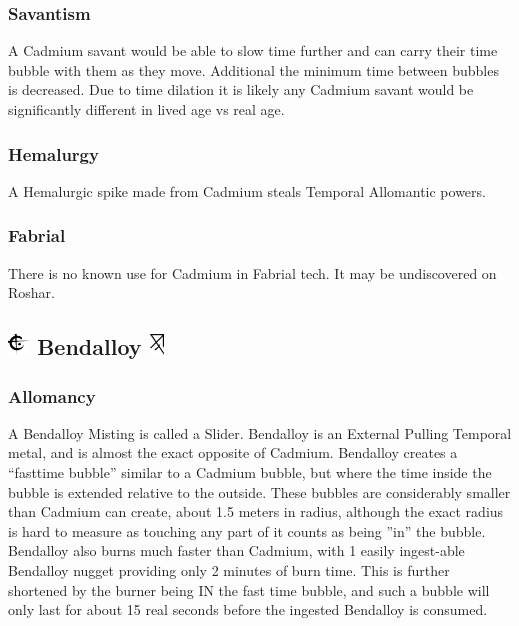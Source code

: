 \documentclass[conference]{IEEEtran}
\begin{document}
\subsubsection*{\textbf{Savantism}}
A Cadmium savant would be able to slow time further and can carry their time bubble with them as they move.\cite{Bubble-move}\cite{bubble-savant} Additional the minimum time between bubbles is decreased.\cite{TLM-CH8}  Due to time dilation it is likely any Cadmium savant would be significantly different in lived age vs real age.\\
\subsubsection*{\textbf{Hemalurgy}}
A Hemalurgic spike made from Cadmium steals Temporal Allomantic powers.\cite{HE-TB}\\
\subsubsection*{\textbf{Fabrial}}
There is no known use for Cadmium in Fabrial tech.  It may be undiscovered on Roshar.\\

\subsection*{\includegraphics[height=1em]{images/Bendalloy.png}  \textbf{Bendalloy} \includegraphics[height=1em]{images/Bendalloy_(Feruchemy).png}}
\subsubsection*{\textbf{Allomancy}}
A Bendalloy Misting is called a Slider.\cite{ARS}  Bendalloy is an External Pulling Temporal metal,\cite{AL-TB} and is almost the exact opposite of Cadmium.  Bendalloy creates a ``fasttime bubble'' similar to a Cadmium bubble, but where the time inside the bubble is extended relative to the outside.\cite{ARS}  These bubbles are considerably smaller than Cadmium can create, about 1.5 meters in radius,\cite{AoL-CH18} although the exact radius is hard to measure as touching any part of it counts as being ''in'' the bubble.\cite{TLM-CH49}  Bendalloy also burns much faster than Cadmium,\cite{BoM-CH8} with 1 easily ingest-able Bendalloy nugget providing only 2 minutes of burn time.  This is further shortened by the burner being IN the fast time bubble, and such a bubble will only last for about 15 real seconds before the ingested Bendalloy is consumed.\cite{AoL-CH12}
\end{document}
